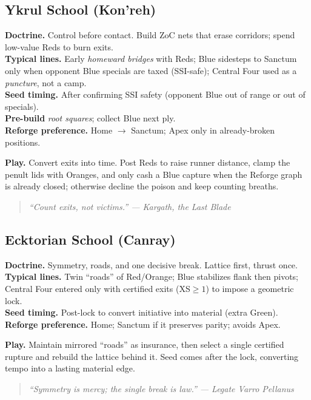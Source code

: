 \documentclass[11pt]{article}
\providecommand{\playdesc}[1]{\par\smallskip\noindent\small\textbf{Play.} #1\par}
\begin{document}
\subsection*{Ykrul School (Kon'reh)}
\textbf{Doctrine.} Control before contact. Build ZoC nets that erase corridors; spend low-value Reds to burn exits.\\
\textbf{Typical lines.} Early \emph{homeward bridges} with Reds; Blue sidesteps to Sanctum only when opponent Blue specials are taxed (SSI-safe); Central Four used as a \emph{puncture}, not a camp.\\
\textbf{Seed timing.} After confirming SSI safety (opponent Blue out of range or out of specials).\\
\textbf{Pre-build} \emph{root squares}; collect Blue next ply. \\
\textbf{Reforge preference.} Home $\rightarrow$ Sanctum; Apex only in already-broken positions.
\playdesc{Convert exits into time. Post Reds to raise runner distance, clamp the penult lids with Oranges, and only cash a Blue capture when the Reforge graph is already closed; otherwise decline the poison and keep counting breaths.}
\medskip
\begin{quote}\small\itshape
“Count exits, not victims.” — Kargath, the Last Blade
\end{quote}

\subsection*{Ecktorian School (Canray)}
\textbf{Doctrine.} Symmetry, roads, and one decisive break. Lattice first, thrust once.\\
\textbf{Typical lines.} Twin ``roads'' of Red/Orange; Blue stabilizes flank then pivots; Central Four entered only with certified exits (XS$\ge1$) to impose a geometric lock.\\
\textbf{Seed timing.} Post-lock to convert initiative into material (extra Green).\\
\textbf{Reforge preference.} Home; Sanctum if it preserves parity; avoids Apex.
\playdesc{Maintain mirrored “roads” as insurance, then select a single certified rupture and rebuild the lattice behind it. Seed comes after the lock, converting tempo into a lasting material edge.}
\begin{quote}\small\itshape
“Symmetry is mercy; the single break is law.” — Legate Varro Pellanus
\end{quote}
\end{document}
